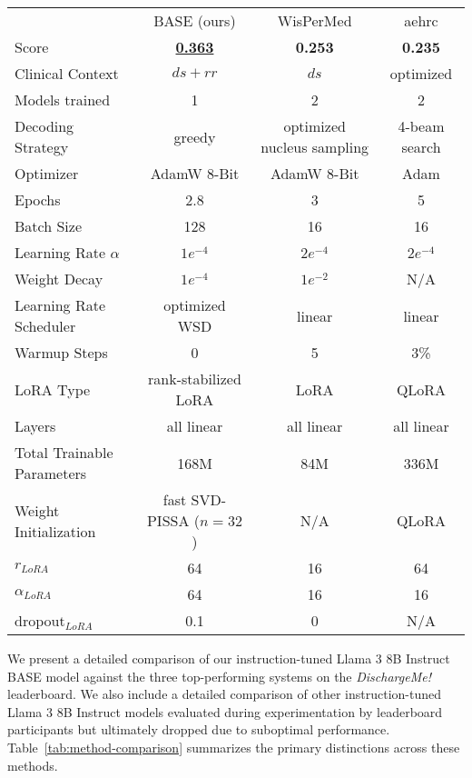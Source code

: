 \begin{table*}[ht]
\centering
\begin{tabular}{lccc}
\hline
 & BASE (ours) & WisPerMed & aehrc \\
Score & \underline{\textbf{0.363}} & \textbf{0.253} & \textbf{0.235} \\
\hline
Clinical Context & $ds + rr$ & $ds$ & optimized \\
Models trained & 1 & 2 & 2 \\
Decoding Strategy & greedy & optimized nucleus sampling & 4-beam search \\
\hline
Optimizer & AdamW 8-Bit & AdamW 8-Bit & Adam \\
Epochs & 2.8 & 3 & 5 \\
Batch Size & 128 & 16 & 16 \\
Learning Rate $\alpha$ & $1e^{-4}$ & $2e^{-4}$ & $2e^{-4}$ \\
Weight Decay & $1e^{-4}$  & $1e^{-2}$  & N/A \\
Learning Rate Scheduler & optimized WSD & linear &  linear \\
Warmup Steps & 0 & 5  & 3\% \\
\hline
LoRA Type & rank-stabilized LoRA & LoRA & QLoRA \\
Layers & all linear & all linear & all linear \\
Total Trainable Parameters & 168M & 84M & 336M \\
Weight Initialization & fast SVD-PISSA ($n=32$) & N/A & QLoRA \\
$r_{LoRA}$ & 64 & 16 & 64 \\
$\alpha_{LoRA}$ & 64 & 16 & 16 \\
dropout$_{LoRA}$ & 0.1 & 0 & N/A \\
\hline
\end{tabular}
\caption{Detailed comparison of training configurations, decoding strategies, and scores for instruction-tuned Llama 3 8B Instruct models, highlighting the key differences among our, WisPerMed's and aehrc's approach. $ds$ = Discharge Summary. $rr$ = Radiology Reports. N/A = Not Available.}
\label{tab:method-comparison}
\end{table*}


We present a detailed comparison of our instruction-tuned Llama 3 8B Instruct BASE model against the three top-performing systems on the \textit{DischargeMe!} leaderboard. We also include a detailed comparison of other instruction-tuned Llama 3 8B Instruct models evaluated during experimentation by leaderboard participants but ultimately dropped due to suboptimal performance. Table~\ref{tab:method-comparison} summarizes the primary distinctions across these methods.

